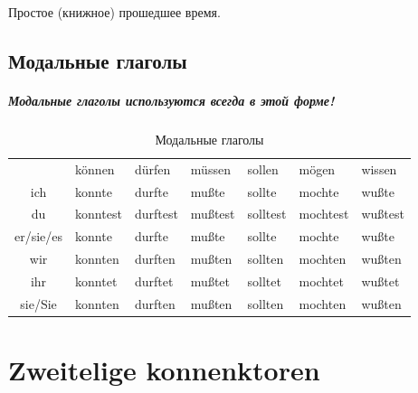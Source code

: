 \documentclass[12pt,a4paper]{report}
\begin{document}
Простое (книжное) прошедшее время. 

\section{Модальные глаголы}

\paragraph{Модальные глаголы используются всегда в этой форме!}

\begin{longtable}{ c l l l l l l }
\caption{Модальные глаголы} \label{tab:long} \\
				& können 	& dürfen 	& müssen 	& sollen 	& mögen 	& wissen 	\\
	
	ich 		& konnte 	& durfte 	& mußte 	& sollte 	& mochte 	& wußte 	\\
	du 			& konntest 	& durftest	& mußtest	& solltest	& mochtest	& wußtest 	\\
	er/sie/es 	& konnte 	& durfte 	& mußte		& sollte	& mochte	& wußte		\\
	wir 		& konnten 	& durften 	& mußten	& sollten	& mochten	& wußten	\\
	ihr			& konntet 	& durftet 	& mußtet	& solltet	& mochtet	& wußtet	\\
	sie/Sie		& konnten 	& durften 	& mußten	& sollten	& mochten	& wußten	\\

\end{longtable}

\chapter{Zweitelige konnenktoren}
\end{document}
